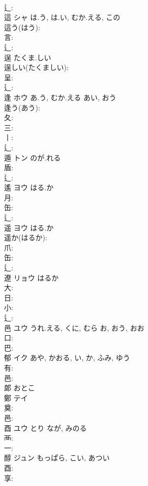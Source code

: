 \documentclass[8pt]{extreport}
\begin{document}
\begin{CJK}{UTF8}{min}
\\	辶: 
\\	這	シャ	は.う, は.い, むか.える, この		
\\	這う(はう): 
\\	言: 
\\	辶: 
\\	逞		たくま.しい			
\\	逞しい(たくましい): 
\\	呈: 
\\	辶: 
\\	逢	ホウ	あ.う, むか.える	あい, おう	
\\	逢う(あう): 
\\	夂: 
\\	三: 
\\	丨: 
\\	辶: 
\\	遁	トン	のが.れる		
\\	盾: 
\\	辶: 
\\	遙	ヨウ	はる.か		
\\	月: 
\\	缶: 
\\	辶: 
\\	遥	ヨウ	はる.か		
\\	遥か(はるか): 
\\	爪: 
\\	缶: 
\\	辶: 
\\	遼	リョウ		はるか	
\\	大: 
\\	日: 
\\	小: 
\\	辶: 
\\	邑	ユウ	うれ.える, くに, むら	お, おう, おお	
\\	口: 
\\	巴: 
\\	郁	イク		あや, かおる, い, か, ふみ, ゆう	
\\	有: 
\\	邑: 
\\	郞		おとこ				
\\	鄭	テイ			
\\	奠: 
\\	邑: 
\\	酉	ユウ	とり	なが, みのる	
\\	襾: 
\\	一: 
\\	醇	ジュン	もっぱら, こい, あつい		
\\	酉: 
\\	享: 

\end{CJK}
\end{document}
